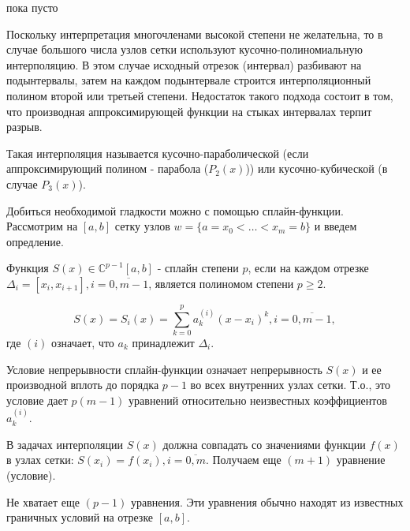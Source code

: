 \begin{col-answer-preambule}
	\begin{plan}
    \item пока пусто
	\end{plan}
\end{col-answer-preambule}


Поскольку интерпретация многочленами высокой степени не желательна, то в случае большого числа узлов сетки используют кусочно-полиномиальную интерполяцию. В этом случае исходный отрезок (интервал) разбивают на подынтервалы, затем на каждом подынтервале строится интерполяционный полином второй или третьей степени. Недостаток такого подхода состоит в том, что производная аппроксимирующей функции на стыках интервалах терпит разрыв.

Такая интерполяция называется кусочно-параболической (если аппроксимирующий полином - парабола ($P_2(x)$)) или кусочно-кубической (в случае $P_3(x)$).

Добиться необходимой гладкости можно с помощью сплайн-функции. Рассмотрим на $[a, b]$ сетку узлов $w = \{ a = x_0 < \ldots < x_m = b \}$ и введем опредление.

Функция $S(x) \in \mathbb{C}^{p-1} [a, b]$ - сплайн степени $p$, если на каждом отрезке $\Delta_i = [x_i, x_{i + 1}], i = \overline{0, m - 1}$, является полиномом степени $p \geqslant 2$. 

\begin{equation*}
  S(x) = S_i(x) = \sum\limits_{k = 0}^p a_k^{(i)} (x - x_i)^k, i = \overline{0, m - 1},
\end{equation*}
где $(i)$ означает, что $a_k$ принадлежит $\Delta_i$.

Условие непрерывности сплайн-функции означает непрерывность $S(x)$ и ее производной вплоть до порядка $p-1$ во всех внутренних узлах сетки. Т.о., это условие дает $p (m-1)$ уравнений относительно неизвестных коэффициентов $a_k^{(i)}$. 

В задачах интерполяции $S(x)$ должна совпадать со значениями функции $f(x)$ в узлах сетки: $S(x_i) = f(x_i), i = \overline{0, m}$. Получаем еще $(m + 1)$ уравнение (условие).

Не хватает еще $(p - 1)$ уравнения. Эти уравнения обычно находят из известных граничных условий на отрезке $[a, b]$.
